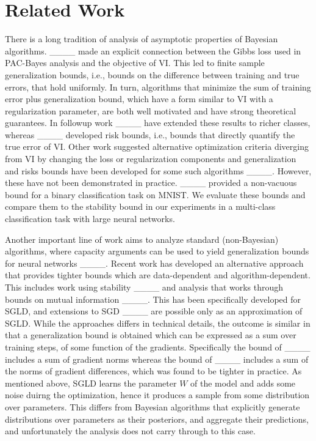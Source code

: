 \section{Related Work}
There is a long tradition of analysis of asymptotic properties of Bayesian algorithms. 
____ made an explicit connection between the Gibbs loss used in PAC-Bayes analysis and the objective of VI. This led to finite sample generalization bounds, i.e., bounds on the difference between training and true errors, that hold uniformly. In turn, algorithms that minimize the sum of training error plus generalization bound,
which have a form similar to VI with a regularization parameter,
are both well motivated and have strong theoretical guarantees. 
In followup work
____ have extended these results to richer classes, whereas ____ developed risk bounds, i.e., bounds that directly quantify the true error of VI. 
Other work suggested alternative optimization criteria diverging from VI by changing the loss or regularization components
\cite[e.g.,][]{black-box-alpha,knoblauch2019generalized,dlm-sgp} and generalization and risks bounds have been developed for some such algorithms 
____. 
However, these have not been demonstrated in practice.
____ provided a non-vacuous bound for a binary classification task on MNIST. 
We evaluate these bounds and compare them to the stability bound
in our experiments in a multi-class classification task with large neural networks.

Another important line of work aims to analyze standard (non-Bayesian) algorithms, where capacity arguments can be used to yield generalization bounds for neural networks ____.
Recent work has developed an alternative approach that provides tighter bounds which are data-dependent and algorithm-dependent. This includes work using stability 
____
and analysis that works through bounds on mutual information
____. 
This has been specifically developed for SGLD, and extensions to SGD ____ are possible only as an approximation of SGLD.
While the approaches differs in technical details, the outcome is similar in that a generalization bound is obtained which can be expressed as a sum over training steps, of some function of the gradients.
Specifically the bound of ____ includes a sum of gradient norms whereas the bound of ____ includes a sum of the norms of gradient differences, which was found to be tighter in practice. 
As mentioned above,  
SGLD learns the parameter $W$ of the model and adds some noise duirng the optimization, hence it produces a sample from some distribution over parameters. 
This differs from Bayesian algorithms that explicitly generate distributions over parameters as their posteriors, and aggregate their predictions, and unfortunately the analysis does not carry through to this case. 


